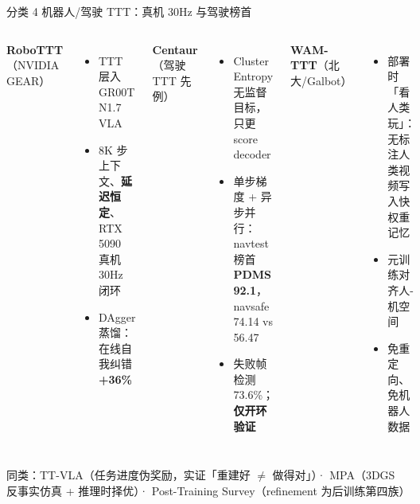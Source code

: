 \documentclass[10pt,aspectratio=169]{beamer}
\newcommand{\hl}[1]{\textcolor{good}{\textbf{#1}}}
\newcommand{\wa}[1]{\textcolor{warn}{\textbf{#1}}}
\begin{document}
\begin{frame}{分类 4 机器人/驾驶 TTT：真机 30Hz 与驾驶榜首}
\small
\begin{columns}[T]
\textbf{RoboTTT}（NVIDIA GEAR）
\begin{itemize}
\item TTT 层入 GR00T N1.7 VLA
\item 8K 步上下文、\hl{延迟恒定}、RTX 5090 真机 30Hz 闭环
\item DAgger 蒸馏：在线自我纠错 \hl{+36\%}
\end{itemize}
\textbf{Centaur}（驾驶 TTT 先例）
\begin{itemize}
\item Cluster Entropy 无监督目标，只更 score decoder
\item 单步梯度 + 异步并行：navtest 榜首 \hl{PDMS 92.1}，navsafe 74.14 vs 56.47
\item 失败帧检测 73.6\%；\wa{仅开环验证}
\end{itemize}
\textbf{WAM-TTT}（北大/Galbot）
\begin{itemize}
\item 部署时「看人类玩」：无标注人类视频写入快权重记忆
\item 元训练对齐人-机空间
\item 免重定向、免机器人数据
\end{itemize}
\end{columns}
\vspace{6pt}
\footnotesize 同类：TT-VLA（任务进度伪奖励，实证「重建好 $\neq$ 做得对」）· MPA（3DGS 反事实仿真 + 推理时择优）· Post-Training Survey（refinement 为后训练第四族）
\end{frame}
\end{document}
